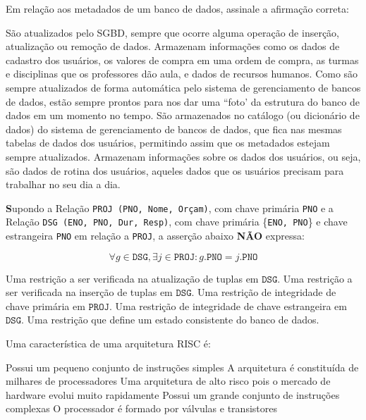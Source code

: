 \documentclass[12pt, addpoints]{exam}
\begin{document}
\begin{questions}
\question

Em relação aos metadados de um banco de dados, assinale a afirmação correta:
\begin{choices}
\choice São atualizados pelo SGBD, sempre que ocorre alguma operação de inserção, atualização ou remoção de dados.
\choice Armazenam informações como os dados de cadastro dos usuários, os valores de compra em uma ordem de compra, as turmas e disciplinas que os professores dão aula, e dados de recursos humanos.
\choice Como são sempre atualizados de forma automática pelo sistema de gerenciamento de bancos de dados, estão sempre prontos para nos dar uma ``foto' da estrutura do banco de dados em um momento no tempo.
\choice São armazenados no catálogo (ou dicionário de dados) do sistema de gerenciamento de bancos de dados, que fica nas mesmas tabelas de dados dos usuários, permitindo assim que os metadados estejam sempre atualizados.
\choice Armazenam informações sobre os dados dos usuários, ou seja, são dados de rotina dos usuários, aqueles dados que os usuários precisam para trabalhar no seu dia a dia.
\end{choices}

\question

\textbf Supondo a Relação \texttt{PROJ (PNO, Nome, Orçam)}, com chave primária \texttt{PNO} e a Relação \texttt{DSG (ENO, PNO, Dur, Resp)}, com chave primária \{\texttt{ENO, PNO}\} e chave estrangeira \texttt{PNO} em relação a \texttt{PROJ}, a asserção abaixo \textbf{NÃO} expressa:



\begin{equation}\forall g \in \texttt{DSG}, \exists j \in \texttt{PROJ} : g.\texttt{PNO} = j.\texttt{PNO}\end{equation}
\begin{choices}
\choice Uma restrição a ser verificada na atualização de tuplas em $\texttt{DSG}$.
\choice Uma restrição a ser verificada na inserção de tuplas em $\texttt{DSG}$.
\choice Uma restrição de integridade de chave primária em $\texttt{PROJ}$.
\choice Uma restrição de integridade de chave estrangeira em $\texttt{DSG}$.
\choice Uma restrição que define um estado consistente do banco de dados.
\end{choices}

\question

Uma característica de uma arquitetura RISC é:
\begin{choices}
\choice Possui um pequeno conjunto de instruções simples
\choice A arquitetura é constituída de milhares de processadores
\choice Uma arquitetura de alto risco pois o mercado de hardware evolui muito rapidamente
\choice Possui um grande conjunto de instruções complexas
\choice O processador é formado por válvulas e transistores
\end{choices}


\end{questions}
\end{document}
